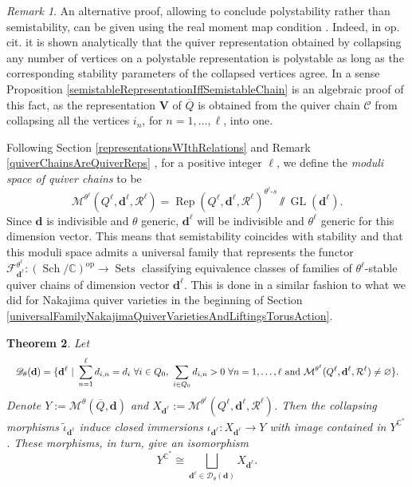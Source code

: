 \documentclass{amsart}
\theoremstyle{plain}
\newtheorem{theorem}{Theorem}[section]
\numberwithin{equation}{section}
\theoremstyle{definition}
\theoremstyle{remark}
\newtheorem{remark}[theorem]{Remark}
\begin{document}
	\begin{remark}
		An alternative proof, allowing to conclude polystability rather than semistability, can be given using the real moment map condition \cite[Proposition 4.9]{NumpaqueTensorProducts}. Indeed, in op. cit. it is shown analytically that the quiver representation obtained by collapsing any number of vertices on a polystable representation is polystable as long as the corresponding stability parameters of the collapsed vertices agree. In a sense Proposition \ref{semistableRepresentationIffSemistableChain} is an algebraic proof of this fact, as the representation $\mathbf{V}$ of $\overline{Q}$ is obtained from the quiver chain $\mathcal{C}$ from collapsing all the vertices $i_n$, for $n=1,\ldots,\ell$, into one. 
	\end{remark}
	Following Section \ref{representationsWIthRelations} and Remark \ref{quiverChainsAreQuiverReps} , for a positive integer $\ell$, we define the \emph{moduli space of quiver chains} to be
	$$
	\mathcal{M}^{\theta^\ell}(Q^\ell,\mathbf{d}^\ell,\mathcal{R}^\ell)= \operatorname{Rep}(Q^\ell,\mathbf{d}^\ell,\mathcal{R}^\ell)^{\theta^\ell\text{-}s}\sslash\operatorname{GL}(\mathbf{d^\ell}).
	$$
	Since $\mathbf{d}$ is indivisible and $\theta$ generic, $\mathbf{d}^\ell$ will be indivisible and $\theta^\ell$ generic for this dimension vector. This means that semistability coincides with stability and that this moduli space admits a universal family that represents the functor $
	\mathcal F_{\mathbf d^\ell}^{\theta^\ell}:(\operatorname{Sch}/\mathbb C)^{\operatorname{op}}
	\rightarrow \operatorname{Sets}$ classifying equivalence classes of families of $\theta^\ell$-stable quiver chains of dimension vector $\mathbf{d}^\ell$. This is done in a similar fashion to what we did for Nakajima quiver varieties in the beginning of Section \ref{universalFamilyNakajimaQuiverVarietiesAndLiftingsTorusAction}. 

	\begin{theorem}\label{quiverChainsClosedImmersion}
		Let 
	$$
				\resizebox{\textwidth}{!}{$\displaystyle
					\mathscr{D}_\theta(\mathbf{d})=\{\mathbf{d}^\ell \ |\ \sum_{n=1}^{\ell}d_{i,n}=d_i\ \forall i\in Q_0,\ \sum_{i\in Q_0}d_{i,n}>0\ \forall n=1,\ldots,\ell{\normalfont \text{ and }}\mathcal{M}^{\theta^\ell}(Q^\ell,\mathbf{d}^\ell,\mathcal{R}^\ell)\neq\varnothing \}.$}
	$$
	Denote $Y:=\mathcal M^\theta(\overline Q,\mathbf d)$
		and
		$X_{\mathbf d^\ell}:=\mathcal M^{\theta^\ell}(Q^\ell,\mathbf d^\ell,\mathcal R^\ell)$. Then the collapsing morphisms $\tilde{\iota}_{\mathbf{d}^\ell}$ induce closed immersions
		$\iota_{\mathbf d^\ell}:X_{\mathbf d^\ell}\rightarrow Y$ with image contained in $Y^{\mathbb{C}^*}$. These morphisms, in turn, give an isomorphism 
		$$
		Y^{\mathbb{C}^*}\cong\bigsqcup_{\mathbf{d}^\ell\in \mathscr{D}_{\theta}(\mathbf{d})}X_{\mathbf{d}^\ell}.
		$$
	\end{theorem}
	
\end{document}
